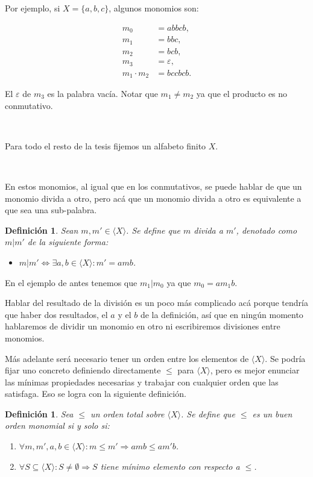 \documentclass[12pt]{report}
\theoremstyle{customstyle}
\newtheorem{definition}[theorem]{Definición}
\theoremstyle{factstyle}
\begin{document}
Por ejemplo, si $X = \{a, b, c\}$, algunos monomios son:

\begin{align*}
  m_0 &= abbcb \text{,} \\
  m_1 &= bbc \text{,} \\
  m_2 &= bcb \text{,} \\
  m_3 &= ε \text{,} \\
  m_1 · m_2 &= bccbcb \text{.}
\end{align*}

El $ε$ de $m_3$ es la palabra vacía. Notar que $m_1 ≠ m_2$ ya que el producto es no conmutativo.

\

Para todo el resto de la tesis fijemos un alfabeto finito $X$.

\

En estos monomios, al igual que en los conmutativos, se puede hablar de que un monomio divida a otro, pero acá que un monomio divida a otro es equivalente a que sea una sub-palabra.

\begin{definition}
  Sean $m, m' ∈ ⟨X⟩$. Se define que $m$ divida a $m'$, denotado como $m | m'$ de la siguiente forma:
  \begin{itemize}
    \item $m | m' ⇔ ∃a , b ∈ ⟨X⟩ : m' = a m b$.
  \end{itemize}
\end{definition}

En el ejemplo de antes tenemos que $m_1 | m_0$ ya que $m_0 = a m_1 b$.

Hablar del resultado de la división es un poco más complicado acá porque tendría que haber dos resultados, el $a$ y el $b$ de la definición, así que en ningún momento hablaremos de dividir un monomio en otro ni escribiremos divisiones entre monomios.

Más adelante será necesario tener un orden entre los elementos de $⟨X⟩$. Se podría fijar uno concreto definiendo directamente $≤$ para $⟨X⟩$, pero es mejor enunciar las mínimas propiedades necesarias y trabajar con cualquier orden que las satisfaga. Eso se logra con la siguiente definición.

\begin{definition}\label{def:buen orden monomial}
  Sea $≤$ un orden total sobre $⟨X⟩$. Se define que $≤$ es un buen orden monomial si y solo si:
  \begin{enumerate}
    \item $∀m, m', a, b ∈ ⟨X⟩ : m ≤ m' ⇒ a m b ≤ a m' b$.
    \item $∀S ⊆ ⟨X⟩ : S ≠ ∅ ⇒ S$ tiene mínimo elemento con respecto a $≤$.
  \end{enumerate}
\end{definition}
\end{document}
